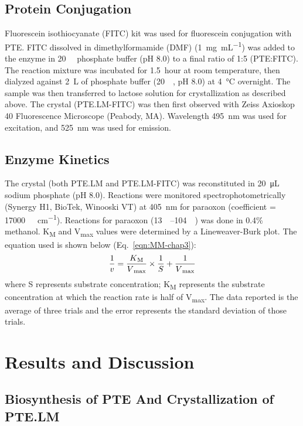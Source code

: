 \begin{refsection}
\subsection{Protein Conjugation}

Fluorescein isothiocyanate (FITC) kit was used
for fluorescein conjugation with PTE. FITC dissolved in dimethylformamide (DMF)
(\SI{1}{\mg\per\mL}) was added to the enzyme in \SI{20}{\milli\Molar} phosphate
buffer (pH 8.0) to a final ratio of 1:5 (PTE:FITC). The reaction mixture was
incubated for \SI{1.5}{hour} at room temperature, then dialyzed against
\SI{2}{\liter} of phosphate buffer (\SI{20}{\milli\Molar}, pH 8.0) at
\SI{4}{\celsius} overnight.  The sample was then transferred to lactose
solution for crystallization as described above. The crystal (PTE.LM-FITC) was
then first observed with Zeiss Axioskop 40 Fluorescence Microscope (Peabody,
MA).  Wavelength \SI{495}{\nm} was used for excitation, and \SI{525}{\nm} was
used for emission. 

\subsection{Enzyme Kinetics}

The crystal (both PTE.LM and PTE.LM-FITC) was reconstituted in
\SI{20}{\micro\liter} sodium phosphate (pH 8.0). Reactions were monitored
spectrophotometrically (Synergy H1, BioTek, Winooski VT) at \SI{405}{\nm} for
paraoxon (coefficient = \SI{17000}{\per\Molar\per\cm}).  Reactions for paraoxon
(\SIrange{13}{104}{\micro\Molar}) was done in 0.4\% methanol.
K\textsubscript{M} and V\textsubscript{max} values were determined by a
Lineweaver-Burk plot.\cite{Baker2011b} The equation used is shown below
(Eq.~\ref{eqn:MM-chap3}): 
\begin{equation} 
    \frac{1}{v} =
    \frac{K\textsubscript{M}}{V\textsubscript{max}}\times\frac{1}{S} +
    \frac{1}{V\textsubscript{max}} 
    \label{eqn:MM-chap3}
\end{equation}
where S represents substrate concentration; K\textsubscript{M} represents the
substrate concentration at which the reaction rate is half of
V\textsubscript{max}. The data reported is the average of three trials and the
error represents the standard deviation of those trials.

\section{Results and Discussion}

\subsection{Biosynthesis of PTE And Crystallization of PTE.LM}


\end{refsection}
